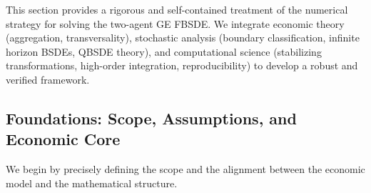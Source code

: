 \documentclass[11pt,letterpaper,oneside]{article}
\theoremstyle{plain}
\theoremstyle{definition}
\theoremstyle{remark}
\begin{document}
This section provides a rigorous and self-contained treatment of the numerical strategy for solving the two-agent GE FBSDE. We integrate economic theory (aggregation, transversality), stochastic analysis (boundary classification, infinite horizon BSDEs, QBSDE theory), and computational science (stabilizing transformations, high-order integration, reproducibility) to develop a robust and verified framework.

\subsection{Foundations: Scope, Assumptions, and Economic Core}
\label{subsec:GE_foundations}

We begin by precisely defining the scope and the alignment between the economic model and the mathematical structure.
\end{document}
